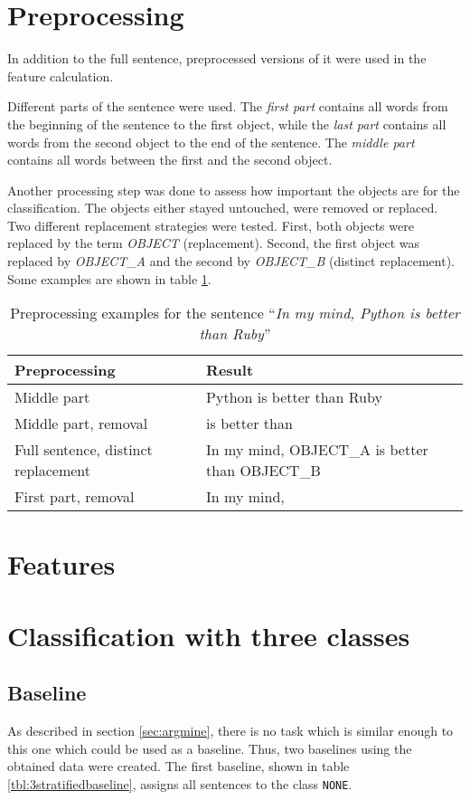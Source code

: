 \section{Preprocessing}
In addition to the full sentence, preprocessed versions of it were used in the feature calculation.

Different parts of the sentence were used. The \emph{first part} contains all words from the beginning of the sentence to the first object, while the \emph{last part} contains all words from the second object to the end of the sentence. The \emph{middle part} contains all words between the first and the second object.

Another processing step was done to assess how important the objects are for the classification. The objects either stayed untouched, were removed or replaced. Two different replacement strategies were tested. First, both objects were replaced by the term \emph{OBJECT} (replacement). Second, the first object was replaced by \emph{OBJECT\_A} and the second by \emph{OBJECT\_B} (distinct replacement). Some examples are shown in table \ref{preprocessing_example}.

\begin{table}[h]
\centering

\caption{Preprocessing examples for the sentence \enquote{\emph{In my mind, Python is better than Ruby}}}
\label{preprocessing_example}
\begin{tabularx}{\linewidth}{lX}
\toprule
Preprocessing & Result \\ \midrule
Middle part & Python is better than Ruby \\
Middle part, removal & is better than \\
Full sentence, distinct replacement &In my mind, OBJECT\_A is better than OBJECT\_B \\
First part, removal & In my mind, \\
\bottomrule
\end{tabularx}

\end{table}


\section{Features}


\section{Classification with three classes}
\subsection{Baseline}
\label{sec:3_baseline}
As described in section \ref{sec:argmine}, there is no task which is similar enough to this one which could be used as a baseline. Thus, two baselines using the obtained data were created. The first baseline, shown in table \ref{tbl:3stratifiedbaseline}, assigns all sentences to the class \texttt{NONE}.

